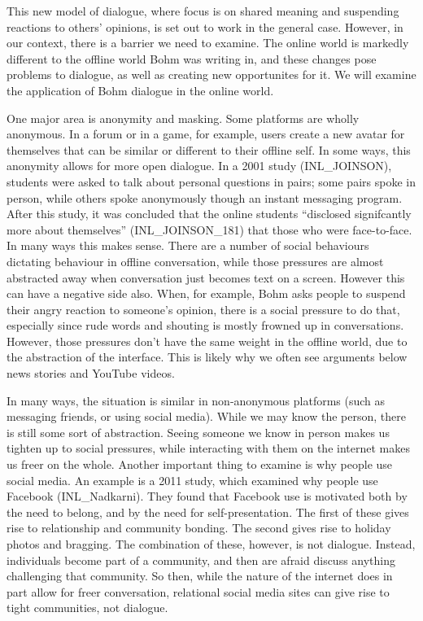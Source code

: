 \documentclass[]{article}
\begin{document}
This new model of dialogue, where focus is on shared meaning and
suspending reactions to others' opinions, is set out to work in the
general case. However, in our context, there is a barrier we need to
examine. The online world is markedly different to the offline world
Bohm was writing in, and these changes pose problems to dialogue, as
well as creating new opportunites for it. We will examine the
application of Bohm dialogue in the online world.

One major area is anonymity and masking. Some platforms are wholly
anonymous. In a forum or in a game, for example, users create a new
avatar for themselves that can be similar or different to their offline
self. In some ways, this anonymity allows for more open dialogue. In a
2001 study (INL\_JOINSON), students were asked to talk about personal
questions in pairs; some pairs spoke in person, while others spoke
anonymously though an instant messaging program. After this study, it
was concluded that the online students ``disclosed signifcantly more
about themselves'' (INL\_JOINSON\_181) that those who were face-to-face.
In many ways this makes sense. There are a number of social behaviours
dictating behaviour in offline conversation, while those pressures are
almost abstracted away when conversation just becomes text on a screen.
However this can have a negative side also. When, for example, Bohm asks
people to suspend their angry reaction to someone's opinion, there is a
social pressure to do that, especially since rude words and shouting is
mostly frowned up in conversations. However, those pressures don't have
the same weight in the offline world, due to the abstraction of the
interface. This is likely why we often see arguments below news stories
and YouTube videos.

In many ways, the situation is similar in non-anonymous platforms (such
as messaging friends, or using social media). While we may know the
person, there is still some sort of abstraction. Seeing someone we know
in person makes us tighten up to social pressures, while interacting
with them on the internet makes us freer on the whole. Another important
thing to examine is why people use social media. An example is a 2011
study, which examined why people use Facebook (INL\_Nadkarni). They
found that Facebook use is motivated both by the need to belong, and by
the need for self-presentation. The first of these gives rise to
relationship and community bonding. The second gives rise to holiday
photos and bragging. The combination of these, however, is not dialogue.
Instead, individuals become part of a community, and then are afraid
discuss anything challenging that community. So then, while the nature
of the internet does in part allow for freer conversation, relational
social media sites can give rise to tight communities, not dialogue.
\end{document}
